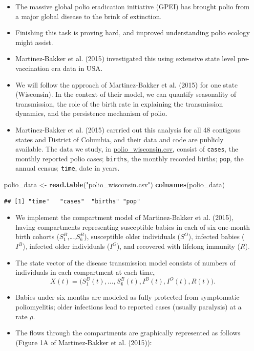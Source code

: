 \documentclass[]{article}
\newenvironment{Shaded}{\begin{snugshade}}{\end{snugshade}}
\newcommand{\KeywordTok}[1]{\textcolor[rgb]{0.13,0.29,0.53}{\textbf{#1}}}
\newcommand{\StringTok}[1]{\textcolor[rgb]{0.31,0.60,0.02}{#1}}
\newcommand{\NormalTok}[1]{#1}
\begin{document}
\begin{itemize}
\item
  The massive global polio eradication initiative (GPEI) has brought
  polio from a major global disease to the brink of extinction.
\item
  Finishing this task is proving hard, and improved understanding polio
  ecology might assist.
\item
  Martinez-Bakker et al. (2015) investigated this using extensive state
  level pre-vaccination era data in USA.
\item
  We will follow the approach of Martinez-Bakker et al. (2015) for one
  state (Wisconsin). In the context of their model, we can quantify
  seasonality of transmission, the role of the birth rate in explaining
  the transmission dynamics, and the persistence mechanism of polio.
\item
  Martinez-Bakker et al. (2015) carrried out this analysis for all 48
  contigous states and District of Columbia, and their data and code are
  publicly available. The data we study, in \url{polio_wisconsin.csv},
  consist of \texttt{cases}, the monthly reported polio cases;
  \texttt{births}, the monthly recorded births; \texttt{pop}, the annual
  census; \texttt{time}, date in years.
\end{itemize}

\begin{Shaded}
\begin{Highlighting}[]
\NormalTok{polio_data <-}\StringTok{ }\KeywordTok{read.table}\NormalTok{(}\StringTok{"polio_wisconsin.csv"}\NormalTok{)}
\KeywordTok{colnames}\NormalTok{(polio_data)}
\end{Highlighting}
\end{Shaded}

\begin{verbatim}
## [1] "time"   "cases"  "births" "pop"
\end{verbatim}

\begin{itemize}
\item
  We implement the compartment model of Martinez-Bakker et al. (2015),
  having compartments representing susceptible babies in each of six
  one-month birth cohorts (\(S^B_1\),\ldots{},\(S^B_6\)), susceptible
  older individuals (\(S^O\)), infected babies (\(I^B\)), infected older
  individuals (\(I^O\)), and recovered with lifelong immunity (\(R\)).
\item
  The state vector of the disease transmission model consists of numbers
  of individuals in each compartment at each time,
  \[X(t)=\big(S^B_1(t),...,S^B_6(t), I^B(t),I^O(t),R(t) \big).\]
\item
  Babies under six months are modeled as fully protected from
  symptomatic poliomyelitis; older infections lead to reported cases
  (usually paralysis) at a rate \(\rho\).
\item
  The flows through the compartments are graphically represented as
  follows (Figure 1A of Martinez-Bakker et al. (2015)):
\end{itemize}
\end{document}

